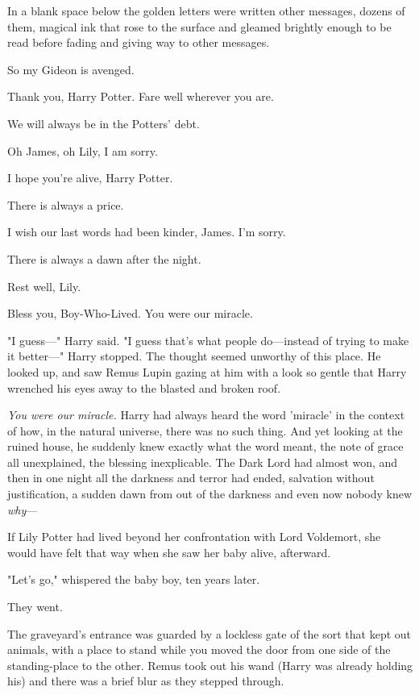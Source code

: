In a blank space below the golden letters were written other messages, dozens 
of them, magical ink that rose to the surface and gleamed brightly enough to be 
read before fading and giving way to other messages.

\begin{center}
So my Gideon is avenged.

Thank you, Harry Potter. Fare well wherever you are.

We will always be in the Potters' debt.

Oh James, oh Lily, I am sorry.

I hope you're alive, Harry Potter.

There is always a price.

I wish our last words had been kinder, James. I'm sorry.

There is always a dawn after the night.

Rest well, Lily.

Bless you, Boy-Who-Lived. You were our miracle.
\end{center}

"I guess---" Harry said. "I guess that's what people do---instead of trying to 
make it better---" Harry stopped. The thought seemed unworthy of this place. He 
looked up, and saw Remus Lupin gazing at him with a look so gentle that Harry 
wrenched his eyes away to the blasted and broken roof.

\emph{You were our miracle.} Harry had always heard the word 'miracle' in the 
context of how, in the natural universe, there was no such thing. And yet 
looking at the ruined house, he suddenly knew exactly what the word meant, the 
note of grace all unexplained, the blessing inexplicable. The Dark Lord had 
almost won, and then in one night all the darkness and terror had ended, 
salvation without justification, a sudden dawn from out of the darkness and 
even now nobody knew \emph{why}---

If Lily Potter had lived beyond her confrontation with Lord Voldemort, she 
would have felt that way when she saw her baby alive, afterward.

"Let's go," whispered the baby boy, ten years later.

They went.

The graveyard's entrance was guarded by a lockless gate of the sort that kept 
out animals, with a place to stand while you moved the door from one side of 
the standing-place to the other. Remus took out his wand (Harry was already 
holding his) and there was a brief blur as they stepped through.

